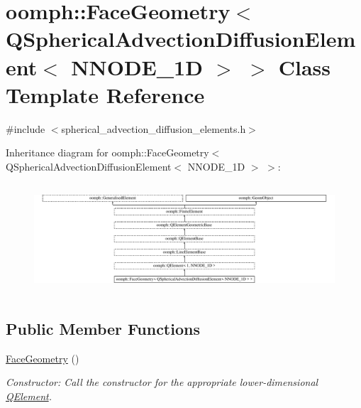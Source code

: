 \hypertarget{classoomph_1_1FaceGeometry_3_01QSphericalAdvectionDiffusionElement_3_01NNODE__1D_01_4_01_4}{}\section{oomph\+:\+:Face\+Geometry$<$ Q\+Spherical\+Advection\+Diffusion\+Element$<$ N\+N\+O\+D\+E\+\_\+1D $>$ $>$ Class Template Reference}
\label{classoomph_1_1FaceGeometry_3_01QSphericalAdvectionDiffusionElement_3_01NNODE__1D_01_4_01_4}


{\ttfamily \#include $<$spherical\+\_\+advection\+\_\+diffusion\+\_\+elements.\+h$>$}

Inheritance diagram for oomph\+:\+:Face\+Geometry$<$ Q\+Spherical\+Advection\+Diffusion\+Element$<$ N\+N\+O\+D\+E\+\_\+1D $>$ $>$\+:\begin{figure}[H]
\begin{center}
\leavevmode
\includegraphics[height=4.109015cm]{classoomph_1_1FaceGeometry_3_01QSphericalAdvectionDiffusionElement_3_01NNODE__1D_01_4_01_4}
\end{center}
\end{figure}
\subsection*{Public Member Functions}
\begin{DoxyCompactItemize}
\item 
\hyperlink{classoomph_1_1FaceGeometry_3_01QSphericalAdvectionDiffusionElement_3_01NNODE__1D_01_4_01_4_a8ed2838c5dacbfa9facfb20466a60039}{Face\+Geometry} ()
\begin{DoxyCompactList}\small\item\em Constructor\+: Call the constructor for the appropriate lower-\/dimensional \hyperlink{classoomph_1_1QElement}{Q\+Element}. \end{DoxyCompactList}\end{DoxyCompactItemize}
